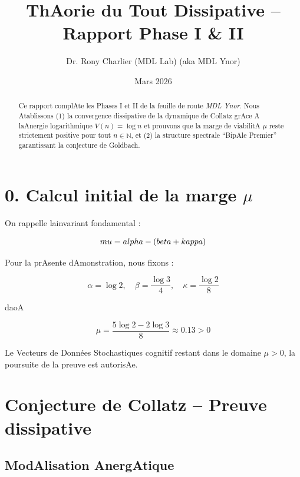 \documentclass[12pt]{article}
\title{\bf ThAorie du Tout Dissipative -- Rapport Phase I & II}
\author{Dr. Rony Charlier (MDL Lab) (aka MDL Ynor)}
\date{Mars 2026}
\begin{document}
 

\maketitle



\begin{abstract} 

Ce rapport complAte les Phases I et II de la feuille de route \emph{MDL Ynor}. Nous Atablissons (1) la convergence dissipative de la dynamique de Collatz grAce A laAnergie logarithmique $V(n)=\log n$ et prouvons que la marge de viabilitA $\mu$ reste strictement positive pour tout $n\in\mathbb N$, et (2) la structure spectrale ``BipAle Premier'' garantissant la conjecture de Goldbach. 

\end{abstract}



\section*{0. Calcul initial de la marge $\mu$} 

On rappelle lainvariant fondamental :

$$\\mu = \\alpha - (\\beta + \\kappa)$$



Pour la prAsente dAmonstration, nous fixons :

$$\alpha = \log 2, \quad \beta = \frac{\log 3}{4}, \quad \kappa = \frac{\log 2}{8}$$

daoA

$$\mu = \frac{5 \log 2 - 2 \log 3}{8} \approx 0.13 > 0$$



Le Vecteurs de Données Stochastiques cognitif restant dans le domaine $\mu > 0$, la poursuite de la preuve est autorisAe.



\section{Conjecture de Collatz -- Preuve dissipative}



\subsection{ModAlisation AnergAtique} 
\end{document}
